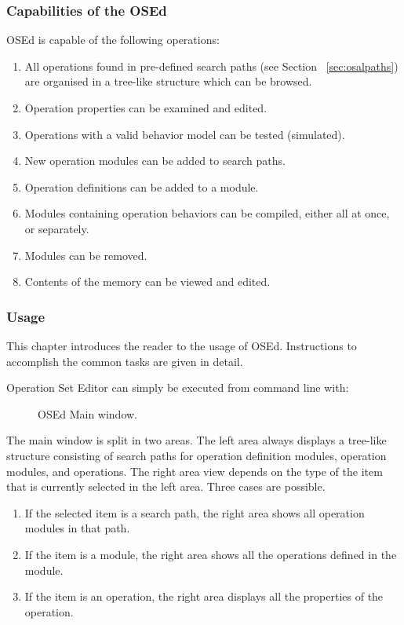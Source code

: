 \documentclass[a4paper,twoside]{tceusermanual}
\begin{document}
\subsubsection{Capabilities of the OSEd}

OSEd is capable of the following operations:

\begin{enumerate}
\item%
  All operations found in pre-defined search paths (see Section
  ~\ref{sec:osalpaths}) are organised in a tree-like structure which can be
  browsed.
\item%
  Operation properties can be examined and edited.
\item%
  Operations with a valid behavior model can be tested (simulated).
\item%
  New operation modules can be added to search paths.
\item%
  Operation definitions can be added to a module.
\item%
  Modules containing operation behaviors can be compiled, either all at
  once, or separately.
\item%
  Modules can be removed.
\item%
  Contents of the memory can be viewed and edited.
\end{enumerate}

\subsubsection{Usage}

This chapter introduces the reader to the usage of OSEd. Instructions to
accomplish the common tasks are given in detail.

Operation Set Editor can simply be executed from command line with:


\begin{figure}[tb]
\centerline{}
\caption{OSEd Main window.}
\label{fig:osed_main_window}
\end{figure}

The main window is split in two areas. The left area always displays a
tree-like structure consisting of search paths for operation definition
modules, operation modules, and operations.  The right area view depends on the
type of the item that is currently selected in the left area. Three cases are
possible.
%
\begin{enumerate}
\item %
  If the selected item is a search path, the right area shows all operation
modules in that path.
\item %
  If the item is a module, the right area shows all the operations defined
  in the module.
\item %
  If the item is an operation, the right area displays all the properties of
  the operation.
\end{enumerate}
\end{document}
